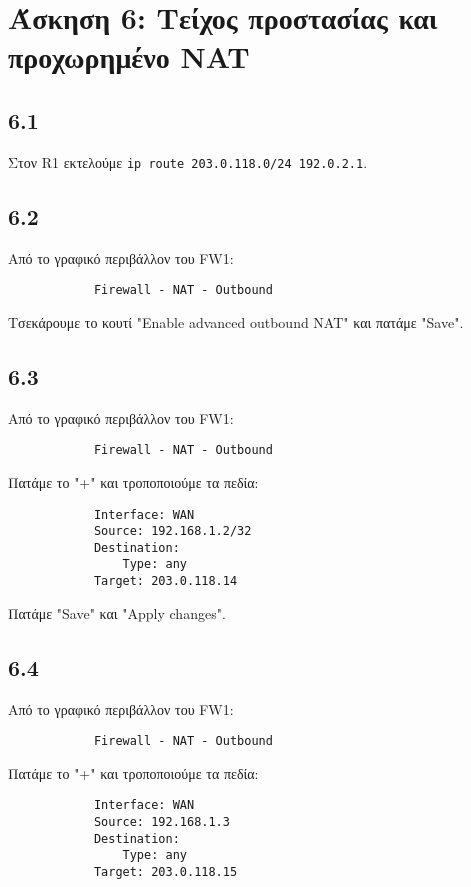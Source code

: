 \documentclass[a4paper, 12pt]{article}
\begin{document}
\section*{Άσκηση 6: Τείχος προστασίας και προχωρημένο NAT}

	\subsection*{6.1}
		Στον R1 εκτελούμε \verb|ip route 203.0.118.0/24 192.0.2.1|.

	\subsection*{6.2}
		Από το γραφικό περιβάλλον του FW1:
		
		\begin{verbatim}
			Firewall - NAT - Outbound
		\end{verbatim}
		
		Τσεκάρουμε το κουτί "Enable advanced outbound NAT" και πατάμε "Save".
		
	\subsection*{6.3}
		Από το γραφικό περιβάλλον του FW1:
		
		\begin{verbatim}
			Firewall - NAT - Outbound
		\end{verbatim}
		
		Πατάμε το "+" και τροποποιούμε τα πεδία:
		
		\begin{verbatim}
			Interface: WAN
			Source: 192.168.1.2/32
			Destination:
			    Type: any
			Target: 203.0.118.14
		\end{verbatim}
		
		Πατάμε "Save" και "Apply changes".

	\subsection*{6.4}
		Από το γραφικό περιβάλλον του FW1:
		
		\begin{verbatim}
			Firewall - NAT - Outbound
		\end{verbatim}
		
		Πατάμε το "+" και τροποποιούμε τα πεδία:
		
		\begin{verbatim}
			Interface: WAN
			Source: 192.168.1.3
			Destination: 
			    Type: any
			Target: 203.0.118.15
		\end{verbatim}
		
\end{document}
